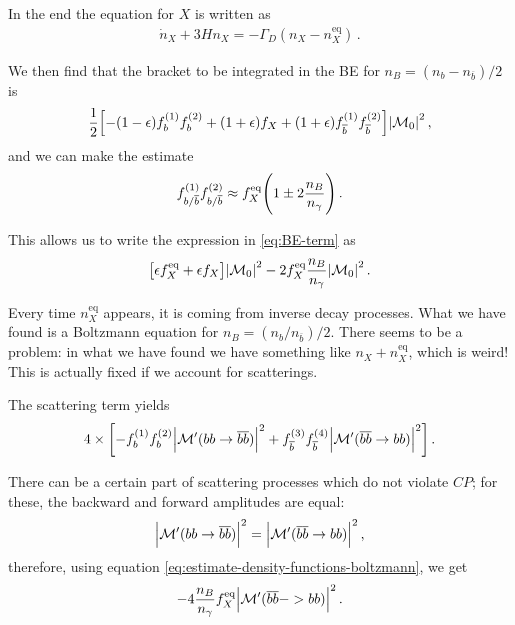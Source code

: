 \documentclass[main.tex]{subfiles}
\begin{document}
In the end the equation for \(X\) is written as 
%
\begin{align}
\dot{n}_X + 3 H n_X = - \Gamma _D (n_X - n_X^{\text{eq}}) 
\,.
\end{align}

We then find that the bracket to be integrated in the BE for \(n_B = (n_b - n_{\overline{b}}) / 2\) is
%
\begin{align} \label{eq:BE-term}
\frac{1}{2} \qty[- (1-\epsilon ) f_b^{(1)} f_b^{(2)} + (1 + \epsilon ) f_X 
+ (1 + \epsilon ) f_{\overline{b}}^{(1)} f_{\overline{b}}^{(2)} ]\abs{\mathcal{M}_0}^2
\,,
\end{align}
%
and we can make the estimate 
%
\begin{align} \label{eq:estimate-density-functions-boltzmann}
f_{b/\overline{b}}^{(1)}
f_{b/\overline{b}}^{(2)} \approx 
f_X^{\text{eq}} \qty(1 \pm 2 \frac{n_B}{n_\gamma })
\,.
\end{align}

This allows us to write the expression in \eqref{eq:BE-term} as 
%
\begin{align}
\qty[\epsilon f_X^{\text{eq}} + \epsilon f_X ] \abs{\mathcal{M}_0}^2
- 2 f_X^{\text{eq}} \frac{n_B}{n_\gamma } \abs{\mathcal{M}_0}^2
\,.
\end{align}

Every time \(n_X^{\text{eq}}\) appears, it is coming from inverse decay processes. 
What we have found is a Boltzmann equation for \(n_B = (n_b / n_{\overline{b}}) / 2\). 
There seems to be a problem: in what we have found we have something like \(n_X + n_X^{\text{eq}}\), which is weird! 
This is actually fixed if we account for scatterings. 

The scattering term yields 
%
\begin{align}
4 \times \qty[
     - f_b^{(1)} f_b^{(2)} \abs{\mathcal{M}' (bb \to \overline{b} \overline{b})}^2 + 
     f_{\overline{b}}^{(3)} f_{\overline{b}}^{(4)} \abs{\mathcal{M}' (\overline{b} \overline{b} \to bb)}^2  
     ]
\,.
\end{align}

There can be a certain part of scattering processes which do not violate \(CP\); for these, the backward and forward amplitudes are equal: 
%
\begin{align}
\abs{\mathcal{M}' (bb \to \overline{b} \overline{b})}^2
=
\abs{\mathcal{M}' (\overline{b} \overline{b} \to bb)}^2
\,,
\end{align}
%
therefore, using equation \eqref{eq:estimate-density-functions-boltzmann}, we get 
%
\begin{align}
- 4 \frac{n_B}{n_\gamma } f_X^{\text{eq}} \abs{\mathcal{M}' (\overline{b} \overline{b} -> bb)}^2
\,.
\end{align}
\end{document}
